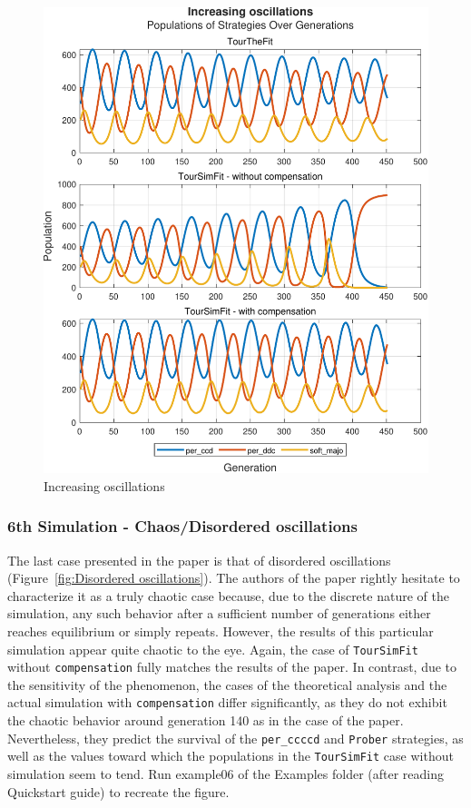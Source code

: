 \documentclass[12pt]{article}
\begin{document}
	\begin{figure}[h]
	      \centering
	      \includegraphics[scale=0.8]{Increasing oscillations.pdf}
	      \caption{Increasing oscillations}
	      \label{fig:Increasing oscillations}
	\end{figure}
\subsubsection{6th Simulation - Chaos/Disordered oscillations}
The last case presented in the paper is that of disordered oscillations (Figure~\ref{fig:Disordered oscillations}). The authors of the paper rightly hesitate to characterize it as a truly chaotic case because, due to the discrete nature of the simulation, any such behavior after a sufficient number of generations either reaches equilibrium or simply repeats. However, the results of this particular simulation appear quite chaotic to the eye. Again, the case of \texttt{TourSimFit} without \texttt{compensation} fully matches the results of the paper. In contrast, due to the sensitivity of the phenomenon, the cases of the theoretical analysis and the actual simulation with \texttt{compensation} differ significantly, as they do not exhibit the chaotic behavior around generation 140 as in the case of the paper. Nevertheless, they predict the survival of the \texttt{per\_ccccd} and \texttt{Prober} strategies, as well as the values toward which the populations in the \texttt{TourSimFit} case without simulation seem to tend. Run example06 of the Examples folder (after reading Quickstart guide) to recreate the figure.
\end{document}
